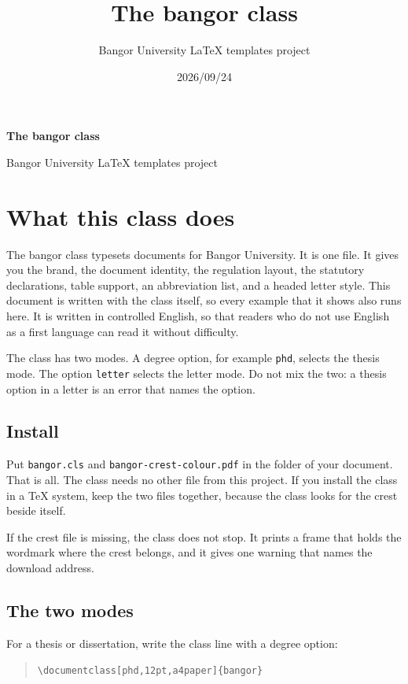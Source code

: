 \documentclass[dissertation,tables,glossary,12pt,a4paper]{bangor}
\title{The bangor class}
\author{Bangor University LaTeX templates project}
\date{2026/09/24}
\begin{document}
\begin{titlepage}
  \centering
  \bangoridentityblock[3.5cm]
  \vfill
  {\LARGE\bfseries The bangor class\par}
  \vfill
  {\large Bangor University LaTeX templates project\par}
  \vfill
\end{titlepage}

\tableofcontents
\printabbrevs

\chapter{What this class does}
The \textsf{bangor} class typesets documents for Bangor University. It is one file. It gives you the brand, the document identity, the regulation layout, the statutory declarations, table support, an abbreviation list, and a headed letter style. This document is written with the class itself, so every example that it shows also runs here. It is written in controlled English, so that readers who do not use English as a first language can read it without difficulty.

The class has two modes. A degree option, for example \verb|phd|, selects the thesis mode. The option \verb|letter| selects the letter mode. Do not mix the two: a thesis option in a letter is an error that names the option.

\section{Install}
Put \verb|bangor.cls| and \verb|bangor-crest-colour.pdf| in the folder of your document. That is all. The class needs no other file from this project. If you install the class in a TeX system, keep the two files together, because the class looks for the crest beside itself.

If the crest file is missing, the class does not stop. It prints a frame that holds the wordmark where the crest belongs, and it gives one warning that names the download address.

\section{The two modes}
For a thesis or dissertation, write the class line with a degree option:

\begin{quote}
  \verb|\documentclass[phd,12pt,a4paper]{bangor}|
\end{quote}
\end{document}
